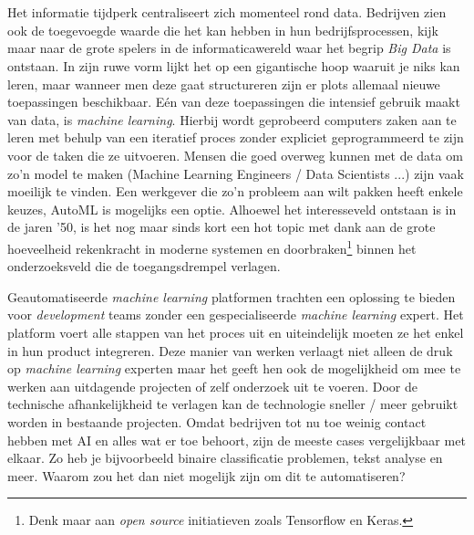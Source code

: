 
\chapter{}
\label{ch:inleiding}

Het informatie tijdperk centraliseert zich momenteel rond data. Bedrijven zien ook de toegevoegde waarde die het kan hebben in hun bedrijfsprocessen, kijk maar naar de grote spelers in de informaticawereld waar het begrip \textit{Big Data} is ontstaan. In zijn ruwe vorm lijkt het op een gigantische hoop waaruit je niks kan leren, maar wanneer men deze gaat structureren zijn er plots allemaal nieuwe toepassingen beschikbaar. 
Eén van deze toepassingen die intensief gebruik maakt van data, is \textit{machine learning}. Hierbij wordt geprobeerd computers zaken aan te leren met behulp van een iteratief proces zonder expliciet geprogrammeerd te zijn voor de taken die ze uitvoeren. Mensen die goed overweg kunnen met de data om zo'n model te maken (Machine Learning Engineers / Data Scientists ...)  zijn vaak moeilijk te vinden. Een werkgever die zo'n probleem aan wilt pakken heeft enkele keuzes, AutoML is mogelijks een optie. Alhoewel het interesseveld ontstaan is in de jaren '50, is het nog maar sinds kort een hot topic met dank aan de grote hoeveelheid rekenkracht in moderne systemen en doorbraken\footnote{Denk maar aan \textit{open source} initiatieven zoals Tensorflow en Keras.} binnen het onderzoeksveld die de toegangsdrempel verlagen.

Geautomatiseerde \textit{machine learning} platformen trachten een oplossing te bieden voor \textit{development} teams zonder een gespecialiseerde \textit{machine learning} expert. Het platform voert alle stappen van het proces uit en uiteindelijk moeten ze het enkel in hun product integreren. Deze manier van werken verlaagt niet alleen de druk op \textit{machine learning} experten maar het geeft hen ook de mogelijkheid om mee te werken aan uitdagende projecten of zelf onderzoek uit te voeren. Door de technische afhankelijkheid te verlagen kan de technologie sneller / meer gebruikt worden in bestaande projecten. Omdat bedrijven tot nu toe weinig contact hebben met AI en alles wat er toe behoort, zijn de meeste cases vergelijkbaar met elkaar. Zo heb je bijvoorbeeld binaire classificatie problemen, tekst analyse en meer. Waarom zou het dan niet mogelijk zijn om dit te automatiseren? 

